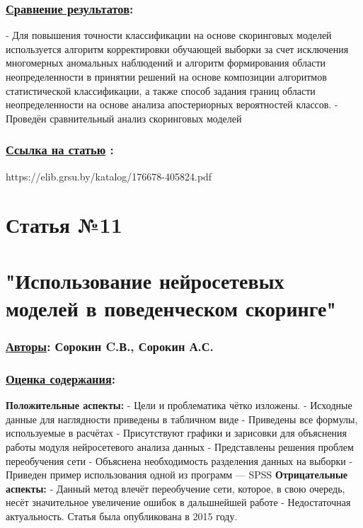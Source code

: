 \documentclass[a4paper,14pt]{article}
\begin{document}
\subsubsection*{\underline{Сравнение результатов}:}
- Для повышения точности классификации на основе скоринговых моделей используется алгоритм корректировки обучающей выборки за счет исключения многомерных аномальных наблюдений и алгоритм формирования области неопределенности в принятии решений на основе композиции алгоритмов статистической классификации, а также способ задания границ области неопределенности на основе анализа апостериорных вероятностей классов. \newline
- Проведён сравнительный анализ скоринговых моделей
\subsubsection*{\underline{Ссылка на статью} :}
https://elib.grsu.by/katalog/176678-405824.pdf


\newpage



\section*{Статья №11}
\section*{"Использование нейросетевых моделей в поведенческом скоринге"}
\subsubsection*{\underline {Авторы}: Сорокин C.В., Сорокин А.С.}
\subsubsection*{\underline{Оценка содержания}:}
\textbf{Положительные аспекты:} \newline
- Цели и проблематика чётко изложены. \newline
- Исходные данные для наглядности приведены в табличном виде \newline
- Приведены все формулы, используемые в расчётах \newline
- Присутствуют графики и зарисовки для объяснения работы модуля нейросетевого анализа данных \newline
- Представлены решения проблем переобучения сети \newline
- Объяснена необходимость разделения данных на выборки \newline
- Приведен пример использования одной из программ — SPSS \vspace{10pt} \newline
\textbf{Отрицательные аспекты:} \newline
- Данный метод влечёт переобучение сети, которое, в свою очередь, несёт значительное увеличение ошибок в дальшнейшей работе \newline
- Недостаточная актуальность. Статья была опубликована в 2015 году.
\end{document}
